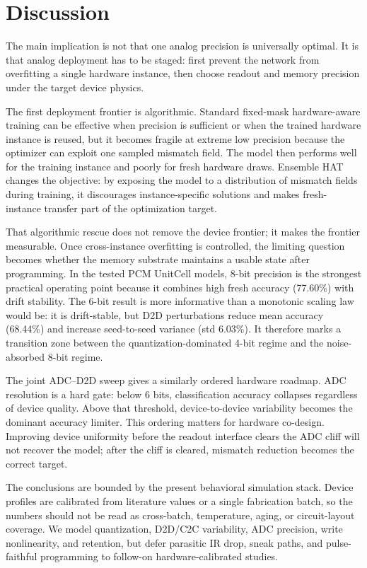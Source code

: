 \section{Discussion}
\label{sec:discussion}

The main implication is not that one analog precision is universally optimal. It is that analog deployment has to be staged: first prevent the network from overfitting a single hardware instance, then choose readout and memory precision under the target device physics.

The first deployment frontier is algorithmic. Standard fixed-mask hardware-aware training can be effective when precision is sufficient or when the trained hardware instance is reused, but it becomes fragile at extreme low precision because the optimizer can exploit one sampled mismatch field. The model then performs well for the training instance and poorly for fresh hardware draws. Ensemble HAT changes the objective: by exposing the model to a distribution of mismatch fields during training, it discourages instance-specific solutions and makes fresh-instance transfer part of the optimization target.

That algorithmic rescue does not remove the device frontier; it makes the frontier measurable. Once cross-instance overfitting is controlled, the limiting question becomes whether the memory substrate maintains a usable state after programming. In the tested PCM UnitCell models, 8-bit precision is the strongest practical operating point because it combines high fresh accuracy (77.60\%) with drift stability. The 6-bit result is more informative than a monotonic scaling law would be: it is drift-stable, but D2D perturbations reduce mean accuracy (68.44\%) and increase seed-to-seed variance (std 6.03\%). It therefore marks a transition zone between the quantization-dominated 4-bit regime and the noise-absorbed 8-bit regime.

The joint ADC--D2D sweep gives a similarly ordered hardware roadmap. ADC resolution is a hard gate: below 6 bits, classification accuracy collapses regardless of device quality. Above that threshold, device-to-device variability becomes the dominant accuracy limiter. This ordering matters for hardware co-design. Improving device uniformity before the readout interface clears the ADC cliff will not recover the model; after the cliff is cleared, mismatch reduction becomes the correct target.

The conclusions are bounded by the present behavioral simulation stack. Device profiles are calibrated from literature values or a single fabrication batch, so the numbers should not be read as cross-batch, temperature, aging, or circuit-layout coverage. We model quantization, D2D/C2C variability, ADC precision, write nonlinearity, and retention, but defer parasitic IR drop, sneak paths, and pulse-faithful programming to follow-on hardware-calibrated studies.

